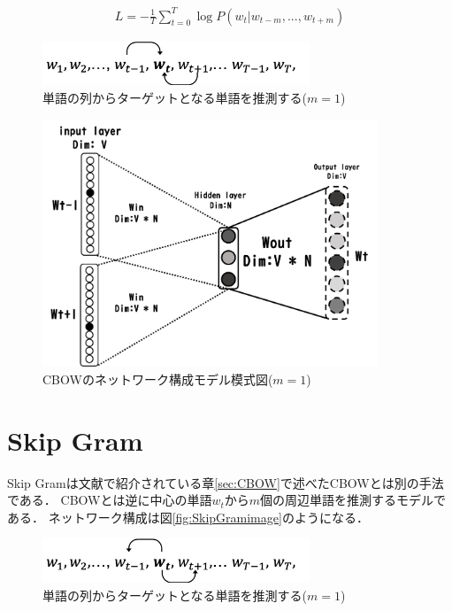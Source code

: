 \documentclass[a4j,11pt,report]{jsbook}
\begin{document}
\begin{equation}[tbh]
  \label{cbow_loss}
  \begin{array}{c}
    L = -\frac{1}{T} \sum_{t = 0}^T \log P(w_{t}|w_{t-m},...,w_{t+m})
  \end{array}
\end{equation}

\begin{figure}[H]
  \centering
  \includegraphics[width = 80mm]{image/cbow_w1w2wt-1wtwt+1.png}
  \caption{単語の列からターゲットとなる単語を推測する($m = 1$)}
  \label{fig:CBOWformula}
\end{figure}

\begin{figure}[H]
  \centering
  \includegraphics[width = 100mm]{image/CBOW_windowsize_1.png}
  \caption{CBOWのネットワーク構成モデル模式図($ m = 1$) }
  \label{fig:CBOWimage}
\end{figure}

\clearpage

\section{Skip Gram \label{sec:SkipGram}}
Skip Gramは文献\cite{SkipCBOW}で紹介されている章\ref{sec:CBOW}で述べたCBOWとは別の手法である．
CBOWとは逆に中心の単語$w_{t}$から$m$個の周辺単語を推測するモデルである．
ネットワーク構成は図\ref{fig:SkipGramimage}のようになる．

\begin{figure}[H]
  \centering
  \includegraphics[width = 80mm]{image/skipgram_w1w2wt-1wtwt+1.png}
  \caption{単語の列からターゲットとなる単語を推測する($m = 1$)}
  \label{fig:Skipformula}
\end{figure}
\end{document}
